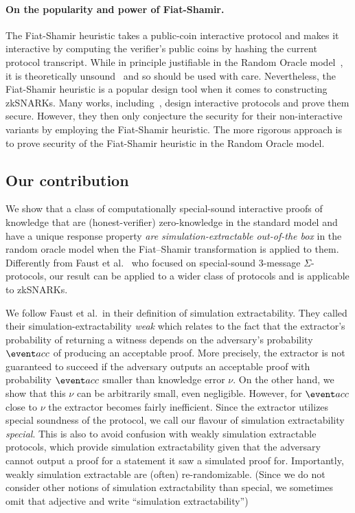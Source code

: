 \documentclass[runningheads,11pt]{llncs}
\begin{document}
\paragraph{On the popularity and power of Fiat-Shamir.} The Fiat-Shamir
heuristic takes a public-coin interactive protocol and makes it interactive by
computing the verifier's public coins by hashing the current protocol
transcript. While in principle justifiable in the Random Oracle
model~\cite{CCS:BelRog93}, it is theoretically unsound~\cite{FOCS:GolKal03} and
so should be used with care.  Nevertheless, the Fiat-Shamir heuristic is a
popular design tool when it comes to constructing zkSNARKs. Many works,
including~\cite{CCS:MBKM19,EPRINT:GabWilCio19,EC:CHMMVW20}, design interactive
protocols and prove them secure. However, they then only conjecture the security
for their non-interactive variants by employing the Fiat-Shamir heuristic. The
more rigorous approach is to prove security of the Fiat-Shamir heuristic in the
Random Oracle model.

\subsection{Our contribution}
We show that a class of computationally special-sound interactive proofs of
knowledge that are (honest-verifier) zero-knowledge in the standard model and
have a unique response property \emph{are simulation-extractable out-of-the box}
in the random oracle model when the Fiat--Shamir transformation is applied to
them. Differently from Faust et al.~\cite{INDOCRYPT:FKMV12} who focused on
special-sound $3$-message $\Sigma$-protocols, our result can be applied to a
wider class of protocols and is applicable to zkSNARKs.

We follow Faust et al.~in their definition of simulation extractability. They
called their simulation-extractability \emph{weak} which relates to the fact
that the extractor's probability of returning a witness depends on the
adversary's probability $\accProb$ of producing an acceptable proof. More
precisely, the extractor is not guaranteed to succeed if the adversary outputs
an acceptable proof with probability $\accProb$ smaller than knowledge error
$\nu$. On the other hand, we show that this $\nu$ can be arbitrarily small, even
negligible. However, for $\accProb$ close to $\nu$ the extractor becomes fairly
inefficient. Since the extractor utilizes special soundness of the protocol, we
call our flavour of simulation extractability \emph{special}. This is also to
avoid confusion with weakly simulation extractable protocols, which provide
simulation extractability given that the adversary cannot output a proof for a
statement it saw a simulated proof for. Importantly, weakly simulation
extractable are (often) re-randomizable. (Since we do not consider other notions
of simulation extractability than special, we sometimes omit that adjective and
write ``simulation extractability'')
\end{document}
